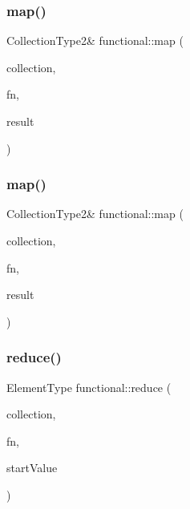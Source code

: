 \mbox{\label{namespacefunctional_a434d0f617a331cc413c711d1039e6466}} 
\subsubsection{\texorpdfstring{map()}{map()}\hspace{0.1cm}{\footnotesize\ttfamily [3/4]}}
{\footnotesize\ttfamily Collection\+Type2\& functional\+::map (\begin{DoxyParamCaption}\item[{Collection\+Type}]{collection,  }\item[{Element\+Type2($\ast$)(Element\+Type)}]{fn,  }\item[{Collection\+Type2 \&}]{result }\end{DoxyParamCaption})}

\mbox{\label{namespacefunctional_a953a6d73bb5771ed9d20dc56eac0959f}} 
\subsubsection{\texorpdfstring{map()}{map()}\hspace{0.1cm}{\footnotesize\ttfamily [4/4]}}
{\footnotesize\ttfamily Collection\+Type2\& functional\+::map (\begin{DoxyParamCaption}\item[{Collection\+Type}]{collection,  }\item[{Element\+Type2($\ast$)(const Element\+Type \&)}]{fn,  }\item[{Collection\+Type2 \&}]{result }\end{DoxyParamCaption})}

\mbox{\label{namespacefunctional_a5399d3c6ee43124afca8e8bce539312a}} 
\subsubsection{\texorpdfstring{reduce()}{reduce()}\hspace{0.1cm}{\footnotesize\ttfamily [1/4]}}
{\footnotesize\ttfamily Element\+Type functional\+::reduce (\begin{DoxyParamCaption}\item[{Collection\+Type}]{collection,  }\item[{Element\+Type($\ast$)(Element\+Type e1, Element\+Type e2)}]{fn,  }\item[{Element\+Type}]{start\+Value }\end{DoxyParamCaption})}

